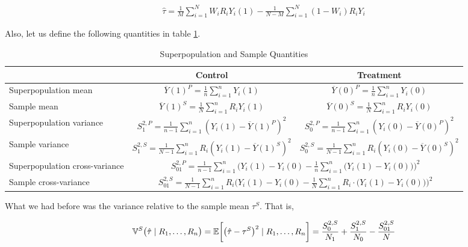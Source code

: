 \begin{align}
    \hat\tau = \frac{1}{M}\sum_{i=1}^N W_iR_iY_i(1) - \frac{1}{N-M}\sum_{i=1}^N (1-W_i)R_iY_i
\end{align}

Also, let us define the following quantities in table \ref{tab:superpopulation-and-sample-quantities}.

\begin{table}[ht]
    \centering
    \label{tab:superpopulation-and-sample-quantities}
    {\renewcommand{\arraystretch}{1.5}
    \begin{tabular}{l|cc}
        \hline
        & Control & Treatment \\
        \hline
        Superpopulation mean & $\overline{Y}({1})^P = \frac{1}{n}\sum_{i=1}^nY_i(1)$ & $\overline{Y}({0})^P = \frac{1}{n}\sum_{i=1}^nY_i(0)$ \\
        Sample mean & $\overline{Y}({1})^S = \frac{1}{N}\sum_{i=1}^n R_iY_i(1)$ & $\overline{Y}({0})^S = \frac{1}{N}\sum_{i=1}^n R_iY_i(0)$ \\
        Superpopulation variance & $S_1^{2,P} = \frac{1}{n-1}\sum_{i=1}^n (Y_i(1) - \overline{Y}({1})^P)^2$ & $S_0^{2,P} = \frac{1}{n-1}\sum_{i=1}^n (Y_i(0) - \overline{Y}({0})^P)^2$ \\
        Sample variance & $S_1^{2,S} = \frac{1}{N-1}\sum_{i=1}^n R_i(Y_i(1) - \overline{Y}({1})^S)^2$ & $S_0^{2,S} = \frac{1}{N-1}\sum_{i=1}^n R_i(Y_i(0) - \overline{Y}({0})^S)^2$ \\ \hline
        Superpopulation cross-variance & \multicolumn{2}{c}{$S_{01}^{2,P} = \frac{1}{n-1}\sum_{i=1}^n \biggl(Y_i(1) - Y_i(0) - \frac{1}{n}\sum_{i=1}^n \bigl(Y_i(1) - Y_i(0)\bigr)\biggr)^2$} \\
        Sample cross-variance & \multicolumn{2}{c}{$S_{01}^{2,S} = \frac{1}{N-1}\sum_{i=1}^n R_i\biggl(Y_i(1) - Y_i(0) - \frac{1}{N}\sum_{i=1}^n R_i\cdot\bigl(Y_i(1) - Y_i(0)\bigr)\biggr)^2$} \\
        \hline
    \end{tabular}
    \caption{Superpopulation and Sample Quantities}
    }
\end{table}

What we had before was the variance relative to the sample mean $\tau^S$. That is,

\begin{align}
    {\mathbb{V}}^S\bigl(\hat\tau \mid R_1, \dots, R_n\bigr) = {\mathbb{E}}\biggl[\bigl(\hat\tau - \tau^S\bigr)^2\mid R_1, \dots, R_n\biggr] = \frac{S_0^{2,S}}{N_1} + \frac{S_1^{2,S}}{N_0} - \frac{S_{01}^{2,S}}{N}
\end{align}


